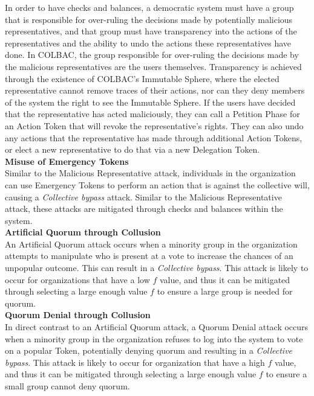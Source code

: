 In order to have checks and balances, a democratic system must have a group that
is responsible for over-ruling the decisions made by potentially malicious
representatives, and that group must have transparency into the actions of the
representatives and the ability to undo the actions these representatives have
done. In COLBAC, the group responsible for over-ruling the decisions made by the
malicious representatives are the users themselves. Transparency is achieved
through the existence of COLBAC's Immutable Sphere, where the elected
representative cannot remove traces of their actions, nor can they deny members
of the system the right to see the Immutable Sphere. If the users have decided
that the representative has acted maliciously, they can call a Petition Phase
for an Action Token that will revoke the representative's rights. They can also
undo any actions that the representative has made through additional Action
Tokens, or elect a new representative to do that via a new Delegation Token.\\

\noindent\textbf{Misuse of Emergency Tokens}\mbox{}\\
Similar to the Malicious Representative attack, individuals in the organization
can use Emergency Tokens to perform an action that is against the collective
will, causing a \emph{Collective bypass} attack. Similar to the Malicious
Representative attack, these attacks are mitigated through checks and balances
within the system.\\

\noindent\textbf{Artificial Quorum through Collusion}\mbox{}\\
An Artificial Quorum attack occurs when a minority group in the organization
attempts to manipulate who is present at a vote to increase the chances of an
unpopular outcome. This can result in a \emph{Collective bypass}. This attack is
likely to occur for organizations that have a low $f$ value, and thus it can
be mitigated through selecting a large enough value $f$ to ensure a large group
is needed for quorum.\\ 

\noindent\textbf{Quorum Denial through Collusion}\mbox{}\\
In direct contrast to an Artificial Quorum attack, a Quorum Denial attack occurs
when a minority group in the organization refuses to log into the system to vote
on a popular Token, potentially denying quorum and resulting in a
\emph{Collective bypass}. This attack is likely to occur for organization that
have a high $f$ value, and thus it can be mitigated through selecting a large
enough value $f$ to ensure a small group cannot deny quorum.
    

